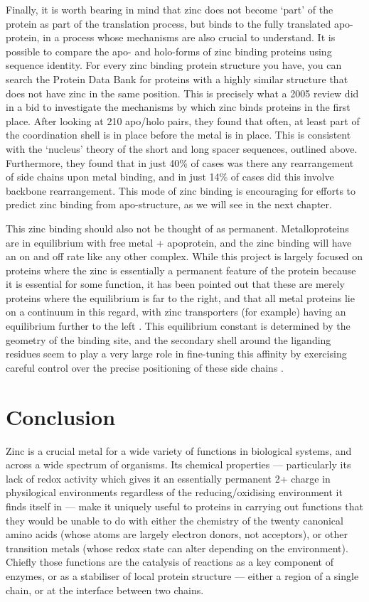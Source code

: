 Finally, it is worth bearing in mind that zinc does not become `part' of the protein as part of the translation process, but binds to the fully translated apo-protein, in a process whose mechanisms are also crucial to understand. It is possible to compare the apo- and holo-forms of zinc binding proteins using sequence identity. For every zinc binding protein structure you have, you can search the Protein Data Bank for proteins with a highly similar structure that does not have zinc in the same position. This is precisely what a 2005 review did \cite{babor2005flexibility} in a bid to investigate the mechanisms by which zinc binds proteins in the first place. After looking at 210 apo/holo pairs, they found that often, at least part of the coordination shell is in place before the metal is in place. This is consistent with the `nucleus' theory of the short and long spacer sequences, outlined above. Furthermore, they found that in just 40\% of cases was there any rearrangement of side chains upon metal binding, and in just 14\% of cases did this involve backbone rearrangement. This mode of zinc binding is encouraging for efforts to predict zinc binding from apo-structure, as we will see in the next chapter.

This zinc binding should also not be thought of as permanent. Metalloproteins are in equilibrium with free metal + apoprotein, and the zinc binding will have an on and off rate like any other complex. While this project is largely focused on proteins where the zinc is essentially a permanent feature of the protein because it is essential for some function, it has been pointed out that these are merely proteins where the equilibrium is far to the right, and that all metal proteins lie on a continuum in this regard, with zinc transporters (for example) having an equilibrium further to the left \cite{maret2010metalloproteomics}. This equilibrium constant is determined by the geometry of the binding site, and the secondary shell around the liganding residues seem to play a very large role in fine-tuning this affinity by exercising careful control over the precise positioning of these side chains \cite{kochanczyk2015relationship}.

\section{Conclusion}

Zinc is a crucial metal for a wide variety of functions in biological systems, and across a wide spectrum of organisms. Its chemical properties --- particularly its lack of redox activity which gives it an essentially permanent 2+ charge in physilogical environments regardless of the reducing/oxidising environment it finds itself in --- make it uniquely useful to proteins in carrying out functions that they would be unable to do with either the chemistry of the twenty canonical amino acids (whose atoms are largely electron donors, not acceptors), or other transition metals (whose redox state can alter depending on the environment). Chiefly those functions are the catalysis of reactions as a key component of enzymes, or as a stabiliser of local protein structure --- either a region of a single chain, or at the interface between two chains.

